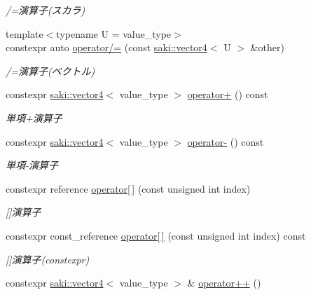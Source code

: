 \begin{DoxyCompactItemize}
\begin{DoxyCompactList}\small\item\em /=演算子(スカラ) \end{DoxyCompactList}\item 
{\footnotesize template$<$typename U  = value\+\_\+type$>$ }\\constexpr auto \mbox{\hyperlink{classsaki_1_1vector4_a4801bb02c1dcbbdde6be286699085628}{operator/=}} (const \mbox{\hyperlink{classsaki_1_1vector4}{saki\+::vector4}}$<$ U $>$ \&other)
\begin{DoxyCompactList}\small\item\em /=演算子(ベクトル) \end{DoxyCompactList}\item 
constexpr \mbox{\hyperlink{classsaki_1_1vector4}{saki\+::vector4}}$<$ value\+\_\+type $>$ \mbox{\hyperlink{classsaki_1_1vector4_a05af0dc450cd074cdf247beb8a4ceedd}{operator+}} () const
\begin{DoxyCompactList}\small\item\em 単項+演算子 \end{DoxyCompactList}\item 
constexpr \mbox{\hyperlink{classsaki_1_1vector4}{saki\+::vector4}}$<$ value\+\_\+type $>$ \mbox{\hyperlink{classsaki_1_1vector4_a24f601d217a8ad649cb0109a20baec2b}{operator-\/}} () const
\begin{DoxyCompactList}\small\item\em 単項-\/演算子 \end{DoxyCompactList}\item 
constexpr reference \mbox{\hyperlink{classsaki_1_1vector4_a6f1d99c42ab1163a09614eed8062c9b5}{operator\mbox{[}$\,$\mbox{]}}} (const unsigned int index)
\begin{DoxyCompactList}\small\item\em \mbox{[}\mbox{]}演算子 \end{DoxyCompactList}\item 
constexpr const\+\_\+reference \mbox{\hyperlink{classsaki_1_1vector4_a545d7cafc89c0267507e5c42f0963c18}{operator\mbox{[}$\,$\mbox{]}}} (const unsigned int index) const
\begin{DoxyCompactList}\small\item\em \mbox{[}\mbox{]}演算子(constexpr) \end{DoxyCompactList}\item 
constexpr \mbox{\hyperlink{classsaki_1_1vector4}{saki\+::vector4}}$<$ value\+\_\+type $>$ \& \mbox{\hyperlink{classsaki_1_1vector4_a8e271ede1ff3ffddcaa89a8b3e04fee7}{operator++}} ()

\end{DoxyCompactItemize}
